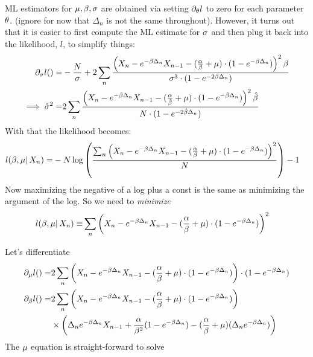 ML estimators for ${\mu },\beta,\sigma$ are obtained via setting ${\partial}_{{ \theta}} l$ to zero for
each parameter ${ \theta}$. (ignore for now that $\Delta_n$ is not the same
throughout). However, it turns out that it is easier to first compute the ML estimate for
$\sigma$ and then plug it back into the likelihood, $l$, to simplify things:
\begin{align}
{\partial}_{\sigma} l()=& -\frac N{\sigma} + 2\sum_n
\frac{ \left( X_n - e^{-\beta \Delta_n} X_{n-1} -
				 (\frac {\alpha}{\beta} + {\mu }) \cdot ( 1-e^{-\beta \Delta_n}) \right)^2 \beta}
				 {\sigma^3 \cdot (1-e^{-2\beta\Delta_n})}
				 \notag
				 \\ 
\implies \hat{\sigma}^2 =& 2\sum_n \frac{ \left( X_n - e^{-\hat{\beta} \Delta_n} X_{n-1} -
				 (\frac {\alpha}{\hat{\beta}} + {\mu }) \cdot ( 1-e^{-\hat{\beta} \Delta_n}) \right)^2
				 \hat{\beta}} {N \cdot (1-e^{-2\hat{\beta}\Delta_n})}
				 \label{eq:sigma_root}
\end{align}
With that the likelihood becomes:
\begin{align*}
l(\beta, {\mu } |\, X_n )=& 
 -N\log \left( 
 \frac{ \sum_n\left( X_n - e^{-\beta \Delta_n} X_{n-1} -
  (\frac {{\alpha}}{{\beta}} + {\mu }) \cdot ( 1-e^{-\beta \Delta_n})
  \right)^2}{N} \right) - 1
\end{align*}
Now maximizing the negative of a log plus a const is the same as minimizing the
argument of the log. So we need to {\itshape minimize}
\begin{align*}
l(\beta, {\mu } |\, X_n )\equiv& 
\sum_n \left( X_n - e^{-\beta \Delta_n} X_{n-1} -
  (\frac {{\alpha}}{{\beta}} + {\mu }) \cdot ( 1-e^{-\beta \Delta_n})
  \right)^2 
\end{align*}
 
Let's differentiate
\begin{subequations}
\begin{align}
{\partial}_{{\mu }} l()=& 2 \sum_n \left( X_n - e^{-\beta \Delta_n} X_{n-1} -
  (\frac {{\alpha}}{{\beta}} + {\mu }) \cdot ( 1-e^{-\beta \Delta_n})  \right) 
  \cdot   ( 1-e^{-\beta \Delta_n})
\\
{\partial}_{\beta} l()=& 2 \sum_n \left( X_n - e^{-\beta \Delta_n} X_{n-1} -
  (\frac {{\alpha}}{{\beta}} + {\mu }) \cdot ( 1-e^{-\beta \Delta_n})  \right) 
  \\ \notag 
  & \times \left( \Delta_n e^{- \beta \Delta_n}X_{n-1} 
  							  + \frac{ \alpha } {\beta^2} (1-e^{-\beta \Delta_n}) 
  					 		  - (\frac {{\alpha}}{{\beta}} + {\mu }) ( \Delta_n e^{- \beta \Delta_n})          
  					 		  \right)
\end{align}
\end{subequations}
The ${\mu }$ equation is straight-forward to solve

